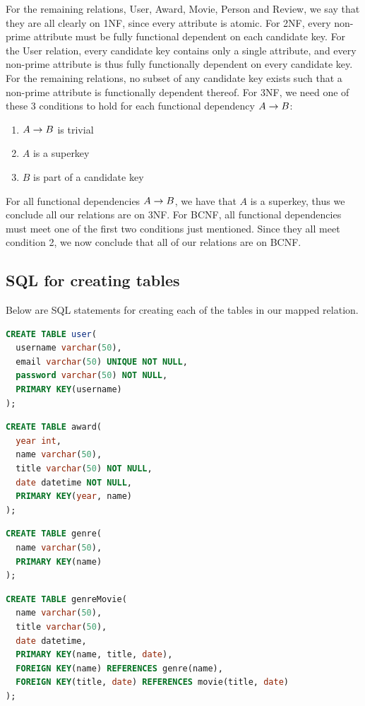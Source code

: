 For the remaining relations, User, Award, Movie, Person and Review, we say that they are all clearly on 1NF, since every attribute is atomic. For 2NF, every non-prime attribute must be fully functional dependent on each candidate key. For the User relation, every candidate key contains only a single attribute, and every non-prime attribute is thus fully functionally dependent on every candidate key. For the remaining relations, no subset of any candidate key exists such that a non-prime attribute is functionally dependent thereof. For 3NF, we need one of these 3 conditions to hold for each functional dependency $A \rightarrow  B$:
\begin{enumerate}
  \item $A \rightarrow B$ is trivial
  \item $A$ is a superkey
  \item $B$ is part of a candidate key
\end{enumerate}
For all functional dependencies $A \rightarrow B$, we have that $A$ is a superkey, thus we conclude all our relations are on 3NF. For BCNF, all functional dependencies must meet one of the first two conditions just mentioned. Since they all meet condition 2, we now conclude that all of our relations are on BCNF.

\subsection{SQL for creating tables}
Below are SQL statements for creating each of the tables in our mapped relation.
\begin{lstlisting}[language=SQL]
CREATE TABLE user(
  username varchar(50),
  email varchar(50) UNIQUE NOT NULL,
  password varchar(50) NOT NULL,
  PRIMARY KEY(username)
);
\end{lstlisting}

\begin{lstlisting}[language=SQL]
CREATE TABLE award(
  year int,
  name varchar(50),
  title varchar(50) NOT NULL,
  date datetime NOT NULL,
  PRIMARY KEY(year, name)
);
\end{lstlisting}

\begin{lstlisting}[language=SQL]
CREATE TABLE genre(
  name varchar(50),
  PRIMARY KEY(name)
);
\end{lstlisting}

\begin{lstlisting}[language=SQL]
CREATE TABLE genreMovie(
  name varchar(50),
  title varchar(50),
  date datetime,
  PRIMARY KEY(name, title, date),
  FOREIGN KEY(name) REFERENCES genre(name),
  FOREIGN KEY(title, date) REFERENCES movie(title, date)
);
\end{lstlisting}

